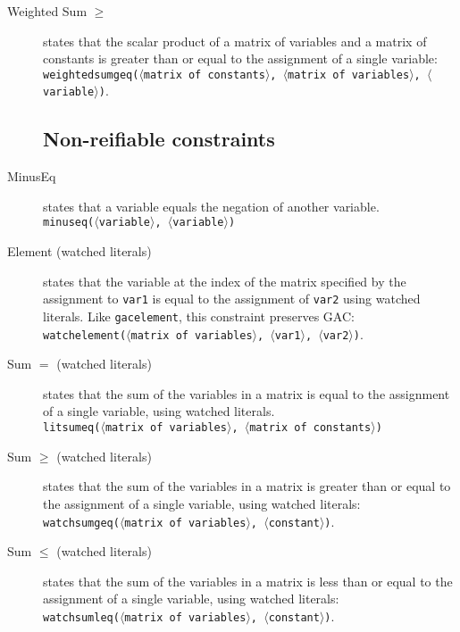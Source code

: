 \documentclass{article}
\begin{document}
\begin{small}
\begin{description}
\item[Weighted Sum $\mathbf{\geq}$] states that the scalar product of
a matrix of variables and a matrix of constants is greater than or
equal to the assignment of a single variable:\\
\texttt{weightedsumgeq($\langle$matrix of constants$\rangle$,
$\langle$matrix of variables$\rangle$, $\langle$variable$\rangle$)}.


\subsection{Non-reifiable constraints}

\item[MinusEq] states that a variable equals the negation of another variable.
\\
\texttt{minuseq($\langle$variable$\rangle$, $\langle$variable$\rangle$)}

\item[Element (watched literals)] states that the variable at the index of the matrix
specified by the assignment to \texttt{var1} is equal to the
assignment of \texttt{var2} using watched literals.  Like \texttt{gacelement}, this constraint preserves GAC:\\ 
\texttt{watchelement($\langle$matrix of
variables$\rangle$, $\langle$var1$\rangle$, $\langle$var2$\rangle$)}.

\item[Sum $\mathbf{=}$ (watched literals)] states that the sum of the variables in a
matrix is equal to the assignment of a single variable, using watched literals. \\
\texttt{litsumeq($\langle$matrix of variables$\rangle$, $\langle$matrix of constants$\rangle$)}


\item[Sum $\mathbf{\geq}$ (watched literals)] states that the sum of the variables in a
matrix is greater than or equal to the assignment of a single
variable, using watched literals:\\ \texttt{watchsumgeq($\langle$matrix of variables$\rangle$,
$\langle$constant$\rangle$)}.

\item[Sum $\mathbf{\leq}$ (watched literals)] states that the sum of the variables in a
matrix is less than or equal to the assignment of a single variable, using watched literals:\\
\texttt{watchsumleq($\langle$matrix of variables$\rangle$,
$\langle$constant$\rangle$)}.


\end{description}
\end{small}
\end{document}
